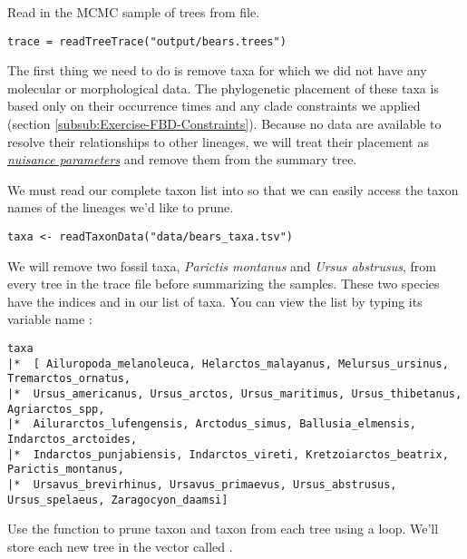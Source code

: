 Read in the MCMC sample of trees from file.
{\tt \begin{snugshade*}
\begin{lstlisting}
trace = readTreeTrace("output/bears.trees")
\end{lstlisting}
\end{snugshade*}}

The first thing we need to do is remove taxa for which we did not have any molecular or morphological data.
The phylogenetic placement of these taxa is based only on their occurrence times and any clade constraints we applied (section \ref{subsub:Exercise-FBD-Constraints}). 
Because no data are available to resolve their relationships to other lineages, we will treat their placement as \href{https://en.wikipedia.org/wiki/Nuisance_parameter}{\textit{nuisance parameters}} and remove them from the summary tree.

We must read our complete taxon list into \RevBayes so that we can easily access the taxon names of the lineages we'd like to prune.
{\tt \begin{snugshade*}
\begin{lstlisting}
taxa <- readTaxonData("data/bears_taxa.tsv")
\end{lstlisting}
\end{snugshade*}}

We will 
remove two fossil taxa, \textit{Parictis montanus} and \textit{Ursus abstrusus}, from every tree in the trace file before summarizing the samples.
These two species have the indices  and  in our list of taxa. 
You can view the list by typing its variable name :
{\tt \begin{snugshade*}
\begin{lstlisting}
taxa 
|*  [ Ailuropoda_melanoleuca, Helarctos_malayanus, Melursus_ursinus, Tremarctos_ornatus,
|*  Ursus_americanus, Ursus_arctos, Ursus_maritimus, Ursus_thibetanus, Agriarctos_spp,
|*  Ailurarctos_lufengensis, Arctodus_simus, Ballusia_elmensis, Indarctos_arctoides,
|*  Indarctos_punjabiensis, Indarctos_vireti, Kretzoiarctos_beatrix, Parictis_montanus,
|*  Ursavus_brevirhinus, Ursavus_primaevus, Ursus_abstrusus, Ursus_spelaeus, Zaragocyon_daamsi]
\end{lstlisting}
\end{snugshade*}}

Use the  function to prune taxon  and taxon  from each tree using a  loop.
We'll store each new tree in the vector called .

